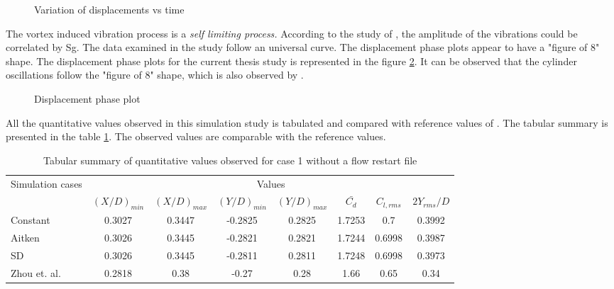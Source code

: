 \begin{figure}[H]
\centering
{}
\caption{Variation of displacements vs time}
\label{fig:4.8}
\end{figure}

The vortex induced vibration process is a \textit{self limiting process.} According to the study of \citet{griffin1992vortex}, the amplitude of the vibrations could be correlated by Sg. The data examined in the study follow an universal curve. The displacement phase plots appear to have a "figure of 8" shape. The displacement phase plots for the current thesis study is represented in the figure \ref{fig:4.9}. It can be observed that the cylinder oscillations follow the "figure of 8" shape, which is also observed by \citet{zhou1999vortex}. 

\begin{figure}[H]
\centering
{}
\caption{Displacement phase plot}
\label{fig:4.9}
\end{figure}

All the quantitative values observed in this simulation study is tabulated and compared with reference values of \citet{zhou1999vortex}. The tabular summary is presented in the table \ref{table:4.6}. The observed values are comparable with the reference values.

\begin{table}[htbp]
  \centering
   \begin{tabular}{|l|c|c|c|c|c|c|c|}
    \hline
    \multicolumn{1}{|c|}{\multirow{2}[4]{*}{Simulation cases}} & \multicolumn{7}{c|}{Values} \\
\cline{2-8}          & $(X/D)_{min}$ & $(X/D)_{max}$ & $(Y/D)_{min}$ & $(Y/D)_{max}$ & $\bar{C_d}$   & $C_{l,rms}$ & $2Y_{rms}/D$ \\
    \hline
    Constant & 0.3027 & 0.3447 & -0.2825 & 0.2825 & 1.7253 & 0.7   & 0.3992 \\
    \hline
    Aitken & 0.3026 & 0.3445 & -0.2821 & 0.2821 & 1.7244 & 0.6998 & 0.3987 \\
    \hline
    SD    & 0.3026 & 0.3445 & -0.2811 & 0.2811 & 1.7248 & 0.6998 & 0.3973 \\
    \hline
    Zhou et. al. & 0.2818 & 0.38  & -0.27 & 0.28  & 1.66  & 0.65  & 0.34 \\
    \hline
    \end{tabular}%
    \caption{Tabular summary of quantitative values observed for case 1 without a flow restart file}
  \label{table:4.6}%
\end{table}%

